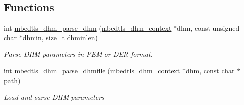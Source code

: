 \subsection*{Functions}
\begin{DoxyCompactItemize}
\item 
int \mbox{\hyperlink{group__x509__module_gae1bf556398cac1761aa2041908e9f619}{mbedtls\+\_\+dhm\+\_\+parse\+\_\+dhm}} (\mbox{\hyperlink{structmbedtls__dhm__context}{mbedtls\+\_\+dhm\+\_\+context}} $\ast$dhm, const unsigned char $\ast$dhmin, size\+\_\+t dhminlen)
\begin{DoxyCompactList}\small\item\em Parse D\+HM parameters in P\+EM or D\+ER format. \end{DoxyCompactList}\item 
int \mbox{\hyperlink{group__x509__module_gae2f53ca5e795b7e8674f092777a5a828}{mbedtls\+\_\+dhm\+\_\+parse\+\_\+dhmfile}} (\mbox{\hyperlink{structmbedtls__dhm__context}{mbedtls\+\_\+dhm\+\_\+context}} $\ast$dhm, const char $\ast$path)
\begin{DoxyCompactList}\small\item\em Load and parse D\+HM parameters. \end{DoxyCompactList}\end{DoxyCompactItemize}
